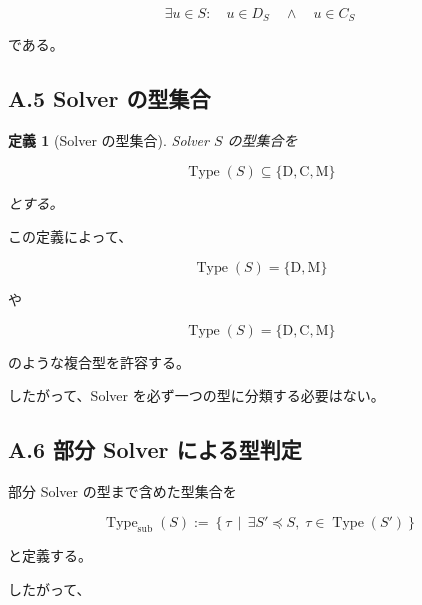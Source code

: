 \documentclass[a4paper,11pt]{article}
\newtheorem{definition}{定義}[section]
\newcommand{\SubSolver}{\preceq}
\newcommand{\Type}{\operatorname{Type}}
\newcommand{\DType}{\mathrm{D}}
\newcommand{\CType}{\mathrm{C}}
\newcommand{\MType}{\mathrm{M}}
\begin{document}
\begin{equation}
    \exists u\in S:
    \quad
    u\in D_S
    \quad\land\quad
    u\in C_S
\end{equation}

である。


\subsection{A.5 Solver の型集合}

\begin{definition}[Solver の型集合]
Solver $S$ の型集合を

\begin{equation}
    \Type(S)
    \subseteq
    \{\DType,\CType,\MType\}
\end{equation}

とする。

\end{definition}

この定義によって、

\begin{equation}
    \Type(S)=\{\DType,\MType\}
\end{equation}

や

\begin{equation}
    \Type(S)
    =
    \{\DType,\CType,\MType\}
\end{equation}

のような複合型を許容する。

したがって、Solver を必ず一つの型に分類する必要はない。


\subsection{A.6 部分 Solver による型判定}

部分 Solver の型まで含めた型集合を

\begin{equation}
    \Type_{\mathrm{sub}}(S)
    :=
    \left\{
        \tau
        \,\middle|\,
        \exists S'\SubSolver S,\;
        \tau\in\Type(S')
    \right\}
\end{equation}

と定義する。

したがって、
\end{document}
